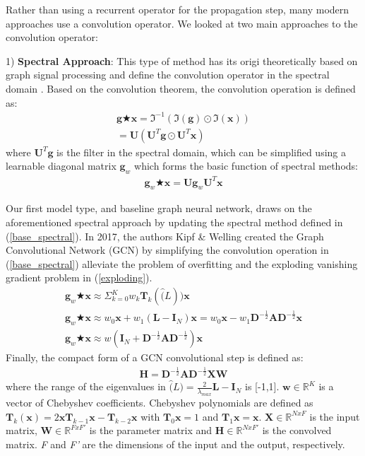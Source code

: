 \documentclass[sigconf, nonacm]{acmart}
\begin{document}
Rather than using a recurrent operator for the propagation step, many modern approaches use a convolution operator. We looked at two main approaches to the convolution operator:

1) \textbf{Spectral Approach}: This type of method has its origi theoretically based on graph signal processing and define the convolution operator in the spectral domain \cite{Mallet1999}. Based on the convolution theorem, the convolution operation is defined as:
\begin{align}
    \mathbf{g} \bigstar \mathbf{x} = \Im^{-1} ( \Im (\mathbf{g}) \odot \Im (\mathbf{x})) \\
    = \mathbf{U}(\mathbf{U}^T\mathbf{g} \odot \mathbf{U}^T\mathbf{x})
\end{align}
where $\mathbf{U}^T\mathbf{g}$ is the filter in the spectral domain, which can be simplified using a learnable diagonal matrix $\mathbf{g}_w$ which forms the basic function of spectral methods:
\begin{align}
    \mathbf{g}_w \bigstar \mathbf{x} = \mathbf{U}\mathbf{g}_w \mathbf{U}^T\mathbf{x}
    \label{base_spectral}
\end{align} 

Our first model type, and baseline graph neural network, draws on the aforementioned spectral approach by updating the spectral method defined in (\ref{base_spectral}). In 2017, the authors Kipf \& Welling created the Graph Convolutional Network (\textsc{GCN}) \cite{Kipf&Welling2017} by simplifying the convolution operation in (\ref{base_spectral}) alleviate the problem of overfitting and the exploding vanishing gradient problem in (\ref{exploding}). 
\begin{align}
    \mathbf{g}_w \bigstar \mathbf{x} \approx \Sigma^K_{k=0} w_k \mathbf{T}_k (\hat(L))\mathbf{x} \\
    \mathbf{g}_w \bigstar \mathbf{x} \approx w_0 \mathbf{x} + w_1(\mathbf{L}-\mathbf{I}_N)\mathbf{x} = w_0\mathbf{x} - w_1\mathbf{D}^{-\frac{1}{2}}\mathbf{A}\mathbf{D}^{-\frac{1}{2}}\mathbf{x} \\
    \mathbf{g}_w \bigstar \mathbf{x} \approx w(\mathbf{I}_N + \mathbf{D}^{-\frac{1}{2}}\mathbf{A}\mathbf{D}^{-\frac{1}{2}})\mathbf{x}
    \label{exploding}
\end{align} 
    Finally, the compact form of a \textsc{GCN} convolutional step is defined as:
\begin{align} 
    \mathbf{H} =  \mathbf{D}^{-\frac{1}{2}} \mathbf{A} \mathbf{D}^{-\frac{1}{2}} \mathbf{X} \mathbf{W}
    \label{GCN_eq}
\end{align} 
where the range of the eigenvalues in $\hat(L) = \frac{2}{\lambda_{max}}\mathbf{L} - \mathbf{I}_N$ is [-1,1]. $\mathbf{w} \in \mathbb{R}^K$ is a vector of Chebyshev coefficients. Chebyshev polynomials are defined as $\mathbf{T}_k (\mathbf{x}) = 2\mathbf{x}\mathbf{T}_{k-1} \mathbf{x} - \mathbf{T}_{k-2} \mathbf{x}$ with $\mathbf{T}_0\mathbf{x} = 1$ and $\mathbf{T}_1\mathbf{x} = \mathbf{x}$. $\mathbf{X} \in \mathbb{R}^{NxF}$ is the input matrix, $\mathbf{W} \in \mathbb{R}^{FxF'}$  is the parameter matrix and $\mathbf{H}  \in \mathbb{R}^{NxF'}$ is the convolved matrix. \textit{F} and \textit{F'} are the dimensions of the input and the output, respectively.
\end{document}
